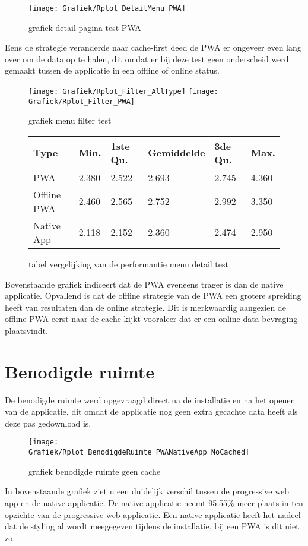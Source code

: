 \begin{figure}[H]
	\texttt{[image: Grafiek/Rplot\_DetailMenu\_PWA]}\centering
	\caption{grafiek detail pagina test PWA}
\end{figure}

Eens de strategie veranderde naar cache-first deed de PWA er ongeveer even lang over  om de data op te halen, dit omdat er bij deze test geen onderscheid werd gemaakt tussen de applicatie in een offline of online status.

\begin{figure}[H]
	\texttt{[image: Grafiek/Rplot\_Filter\_AllType]}\centering
	\texttt{[image: Grafiek/Rplot\_Filter\_PWA]}\centering
	\caption{grafiek menu filter test}
\end{figure}

\begin{figure}[H]
	\begin{tabularx}{\textwidth }{|X|X|X|X|X|X|}
	\hline
		Type        & Min.  & 1ste Qu. & Gemiddelde & 3de Qu. & Max.  \\
	\hline
		PWA         & 2.380 & 2.522    & 2.693      & 2.745   & 4.360 \\
	\hline
		Offline PWA & 2.460 & 2.565    & 2.752      & 2.992   & 3.350 \\
	\hline
		Native App  & 2.118 & 2.152    & 2.360      & 2.474   & 2.950 \\
	\hline
	\end{tabularx}
	\caption{tabel vergelijking van de performantie menu detail test}
\end{figure}

Bovenstaande grafiek indiceert dat de PWA eveneens trager is dan de native applicatie. Opvallend is dat de offline strategie van de PWA een grotere spreiding heeft van resultaten dan de online strategie. Dit is merkwaardig aangezien de offline PWA eerst naar de cache kijkt vooraleer dat er een online data bevraging plaatsvindt.

\section{Benodigde ruimte}
De benodigde ruimte werd opgevraagd direct na de installatie en na het openen van de applicatie, dit omdat de applicatie nog geen extra gecachte data heeft als deze pas gedownload is. 

\begin{figure}[h]
	\texttt{[image: Grafiek/Rplot\_BenodigdeRuimte\_PWANativeApp\_NoCached]}\centering
	\caption{grafiek benodigde ruimte geen cache}
\end{figure}
In bovenstaande grafiek ziet u een duidelijk verschil tussen de progressive web app en de native applicatie. De native applicatie neemt 95.55\% meer plaats in ten opzichte van de progressive web applicatie. Een native applicatie heeft het nadeel dat de styling al wordt meegegeven tijdens de installatie, bij een PWA is dit niet zo.


